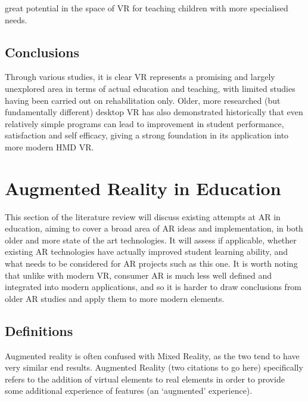 \documentclass[11pt]{report}
\begin{document}
great potential in the space of VR for teaching children with more specialised needs.
\subsection{Conclusions}
Through various studies, it is clear VR represents a promising and largely unexplored area in terms of actual education and teaching, with limited studies having been carried out on rehabilitation only. Older, more researched (but fundamentally different) desktop VR has also demonstrated historically that even relatively simple programs can lead to improvement in student performance, satisfaction and self efficacy, giving a strong foundation in its application into more modern HMD VR.
\section{Augmented Reality in Education}
This section of the literature review will discuss existing attempts at AR in education, aiming to cover a broad area of AR ideas and implementation, in both older and more state of the art technologies. It will assess if applicable, whether existing AR technologies have actually improved student learning ability, and what needs to be considered for AR projects such as this one. It is worth noting that unlike with modern VR, consumer AR is much less well defined and integrated into modern applications, and so it is harder to draw conclusions from older AR studies and apply them to more modern elements.
\subsection{Definitions}
Augmented reality is often confused with Mixed Reality, as the two tend to have very similar end results. Augmented Reality (two citations to go here) specifically refers to the addition of virtual elements to real elements in order to provide some additional experience of features (an `augmented' experience).
\end{document}
